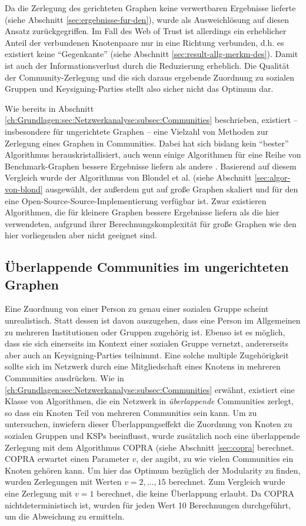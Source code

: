 Da die Zerlegung des gerichteten Graphen keine verwertbaren Ergebnisse
lieferte (siehe Abschnitt \ref{sec:ergebnisse-fur-den}), wurde als
Ausweichlösung auf diesen Ansatz zurückgegriffen.  Im Fall des Web
of Trust ist allerdings ein erheblicher Anteil der verbundenen
Knotenpaare nur in eine Richtung verbunden, d.h. es existiert keine
``Gegenkante'' (siehe Abschnitt
\ref{sec:result-allg-merkm-des}). Damit ist auch der
Informationsverlust durch die Reduzierung erheblich. Die Qualität
der Community-Zerlegung und die sich daraus ergebende Zuordnung zu
sozialen Gruppen und Keysigning-Parties stellt also sicher nicht das
Optimum dar.

Wie bereits in Abschnitt
\ref{ch:Grundlagen:sec:Netzwerkanalyse:subsec:Communities}
beschrieben, existiert -- insbesondere für ungerichtete Graphen --
eine Vielzahl von Methoden zur Zerlegung eines Graphen in
Communities. Dabei hat sich bislang kein ``bester'' Algorithmus
herauskristallisiert, auch wenn einige Algorithmen für eine Reihe
von Benchmark-Graphen bessere Ergebnisse liefern als andere
\cite{Lancichinetti2009}. Basierend auf diesem Vergleich wurde der
Algorithmus von Blondel et al. (siehe Abschnitt
\ref{sec:algor-von-blond} ausgewählt, der außerdem gut auf große
Graphen skaliert und für den eine Open-Source-Source-Implementierung
verfügbar ist.  Zwar existieren Algorithmen, die für kleinere
Graphen bessere Ergebnisse liefern als die hier verwendeten, aufgrund
ihrer Berechnungskomplexität für große Graphen wie den hier
vorliegenden aber nicht geeignet sind.

\subsection{Überlappende Communities im ungerichteten Graphen}
\label{sec:uberl-comm-unger}

Eine Zuordnung von einer Person zu genau einer sozialen Gruppe scheint
unrealistisch. Statt dessen ist davon auszugehen, dass eine Person im
Allgemeinen zu mehreren Institutionen oder Gruppen zugehörig
ist. Ebenso ist es möglich, dass sie sich einerseits im Kontext
einer sozialen Gruppe vernetzt, andererseits aber auch an
Keysigning-Parties teilnimmt. Eine solche multiple Zugehörigkeit
sollte sich im Netzwerk durch eine Mitgliedschaft eines Knotens in
mehreren Communities ausdrücken. Wie in
\ref{ch:Grundlagen:sec:Netzwerkanalyse:subsec:Communities} erwähnt,
existiert eine Klasse von Algorithmen, die ein Netzwerk in
\emph{überlappende} Communities zerlegt, so dass ein Knoten Teil von
mehreren Communities sein kann. Um zu untersuchen, inwiefern dieser
Überlappungseffekt die Zuordnung von Knoten zu sozialen Gruppen und
KSPs beeinflusst, wurde zusätzlich noch eine überlappende
Zerlegung mit dem Algorithmus COPRA (siehe Abschnitt \ref{sec:copra}
berechnet. COPRA erwartet einen Parameter $v$, der angibt, zu wie
vielen Communities ein Knoten gehören kann. Um hier das Optimum
bezüglich der Modularity zu finden, wurden Zerlegungen mit Werten
$v=2, \dots, 15$ berechnet. Zum Vergleich wurde eine Zerlegung mit
$v=1$ berechnet, die keine Überlappung erlaubt. Da COPRA
nichtdeterministisch ist, wurden für jeden Wert 10 Berechnungen
durchgeführt, um die Abweichung zu ermitteln.



